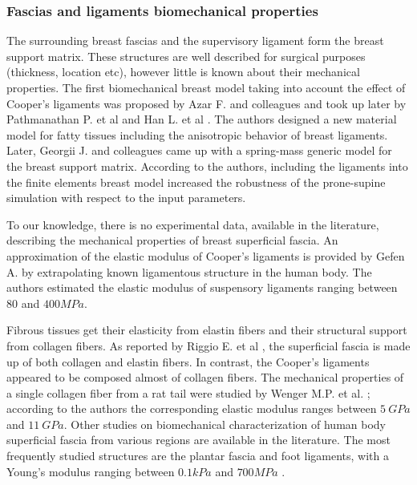 \subsubsection*{Fascias and ligaments biomechanical properties}
The surrounding breast fascias and the supervisory ligament form the breast support matrix. These structures are well described for surgical purposes (thickness, location etc), however little is known about their mechanical properties. The first biomechanical breast model taking into account the effect of Cooper's ligaments was proposed by Azar F. and colleagues \citep{azar_methods_2002} and took up later by Pathmanathan P. et al \citep{pathmanathan_predicting_2008} and Han L. et al \citep{han_development_2012}. The authors designed a new material model for fatty tissues including the anisotropic behavior of breast ligaments. Later, Georgii J. and colleagues \citep{georgii_simulation_2016} came up with a spring-mass generic model for the breast support matrix. According to the authors, including the ligaments into the finite elements breast model increased the robustness of the prone-supine simulation with respect to the input parameters. 

 To our knowledge, there is no experimental data, available in the literature, describing the mechanical properties of breast superficial fascia. An approximation of the elastic modulus of Cooper's ligaments is provided by Gefen A. \citep{gefen_mechanics_2007} by extrapolating known ligamentous structure in the human body. The authors estimated the elastic modulus of suspensory ligaments ranging between $80$ and $400 MPa$.
 
 Fibrous tissues get their elasticity from elastin  fibers and their structural support from collagen fibers. As reported by Riggio E. et al \citep{riggio_anatomical_2000}, the superficial fascia is made up of both collagen and elastin fibers. In contrast, the Cooper's ligaments appeared to be composed almost of collagen fibers.  The mechanical properties of a single collagen fiber from a rat tail were studied by Wenger M.P. et al. \citep{wenger_mechanical_2007}; according to the authors the corresponding elastic modulus ranges between $5\ GPa$ and $11\ GPa$. Other studies on biomechanical characterization of human body superficial fascia from various regions are available in the literature. The most frequently studied structures are the plantar fascia and foot ligaments, with a Young's modulus ranging between $0.1 kPa$ \citep{gefen_vivo_2003} and $700 MPa $ \citep{cheung_effects_2004}. 

